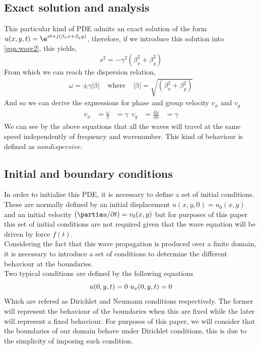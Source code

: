 \subsection{Exact solution and analysis}
\label{chapter3:sec1:ssec1}
This particular kind of PDE admits an exact solution of the form $u(x,y,t)=\e^{st+j(\beta_{x}x+\beta_{y}y)}$, therefore, if we introduce this solution into \ref{eqn:wave2}, this yields,
\begin{equation}
		s^{2}=-\gamma^{2}(\beta_{x}^{2}+\beta_{y}^{2})
\end{equation}
From which we can reach the dispersion relation,
\begin{equation}
	\begin{aligned}
	\omega=\pm \gamma|\mathrm{\beta}| \ \ \ \ \     \text{where} \ \ \ \ \     |\mathrm{\beta}|=\sqrt{(\beta_{x}^{2}+\beta_{y}^{2})}
	\end{aligned}
\end{equation}
And so we can derive the expressions for phase and group velocity $\textit{v}_{\phi}$ and $\textit{v}_{g}$
\begin{equation}
	\begin{aligned*}
		\textit{v}_{\phi}&=\frac{\omega}{\mathrm{\beta}}&=\gamma \ \  
		\textit{v}_{g}&=\frac{\partial \omega}{\partial\mathrm{\beta}}&=\gamma
	\end{aligned*}
\end{equation}
We can see by the above equations that all the waves will travel at the same speed independently of frequency and wavenumber. This kind of behaviour is defined as $\textit{nondispersive}$.
\subsection{Initial and boundary conditions}
\label{chapter3:sec1:ssec2}
In order to initialise this PDE, it is necessary to define a set of initial conditions. These are normally defined by an initial displacement $u(x,y,0)=u_{0}(x,y)$ and an initial velocity $(\partia u/ \partial t)=v_{0}(x,y)$ but for purposes of this paper this set of initial conditions are not required given that the wave equation will be driven by force $f(t)$.\\ 
Considering the fact that this wave propagation is produced over a finite domain, it is necessary to introduce a set of conditions to determine the different behaviour at the boundaries.\\
Two typical conditions are defined by the following equations
\begin{equation}
	u(0,y,t)=0 \\\\\ u_{x}(0,y,t)=0
\end{equation}
Which are refered as Dirichlet and Neumann conditions respectively. The former will represent the behaviour of the boundaries when this are fixed while the later will represent a fixed behaviour. For purposes of this paper, we will consider that the boundaries of our domain behave under Dirichlet conditions, this is due to the simplicity of imposing such condition.
